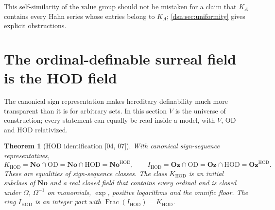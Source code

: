 \documentclass[11pt,a4paper]{article}
\numberwithin{equation}{section}
\newtheorem{theorem}{Theorem}[section]
\theoremstyle{definition}
\theoremstyle{remark}
\newcommand{\No}{\mathbf{No}}
\newcommand{\Oz}{\mathbf{Oz}}
\newcommand{\OD}{\mathrm{OD}}
\newcommand{\HOD}{\mathrm{HOD}}
\newcommand{\Frac}{\operatorname{Frac}}
\newcommand{\KH}{K_{\HOD}}
\newcommand{\IH}{I_{\HOD}}
\newcommand{\src}[1]{\textup{\textsf{\small[#1]}}}
\begin{document}
This self-similarity of the value group should not be mistaken for a claim
that $K_A$ contains every Hahn series whose entries belong to $K_A$;
\cref{dsn:sec:uniformity} gives explicit obstructions.

\section{The ordinal-definable surreal field is the HOD field}
\label{dsn:sec:HOD}

The canonical sign representation makes hereditary definability much
more transparent than it is for arbitrary sets. In this section $V$ is the
universe of construction; every statement can equally be read inside a
model, with $V$, $\OD$ and $\HOD$ relativized.

\begin{theorem}[HOD identification \src{04, 07}]\label{dsn:thm:HOD}
With canonical sign-sequence representatives,
\begin{equation}\label{dsn:eq:HODid}
 \KH=\No\cap\OD=\No\cap\HOD=\No^{\HOD},
 \qquad
 \IH=\Oz\cap\OD=\Oz\cap\HOD=\Oz^{\HOD}.
\end{equation}
These are equalities of sign-sequence classes. The class $\KH$ is an
initial subclass of $\No$ and a real closed field that contains every
ordinal and is closed under $\Omega$, $\Omega^{-1}$ on monomials, $\exp$,
positive logarithms and the omnific floor. The ring $\IH$ is an integer
part with $\Frac(\IH)=\KH$.
\end{theorem}
\end{document}
